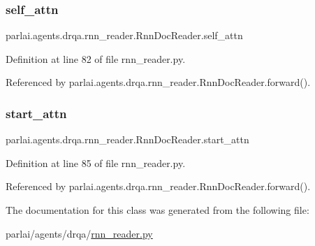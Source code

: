 \subsubsection{\texorpdfstring{self\+\_\+attn}{self\_attn}}
{\footnotesize\ttfamily parlai.\+agents.\+drqa.\+rnn\+\_\+reader.\+Rnn\+Doc\+Reader.\+self\+\_\+attn}



Definition at line 82 of file rnn\+\_\+reader.\+py.



Referenced by parlai.\+agents.\+drqa.\+rnn\+\_\+reader.\+Rnn\+Doc\+Reader.\+forward().

\mbox{\label{classparlai_1_1agents_1_1drqa_1_1rnn__reader_1_1RnnDocReader_ad3f35e5ca950ee0bc56ba3dd41f38fdb}} 
\subsubsection{\texorpdfstring{start\+\_\+attn}{start\_attn}}
{\footnotesize\ttfamily parlai.\+agents.\+drqa.\+rnn\+\_\+reader.\+Rnn\+Doc\+Reader.\+start\+\_\+attn}



Definition at line 85 of file rnn\+\_\+reader.\+py.



Referenced by parlai.\+agents.\+drqa.\+rnn\+\_\+reader.\+Rnn\+Doc\+Reader.\+forward().



The documentation for this class was generated from the following file\+:\begin{DoxyCompactItemize}
\item 
parlai/agents/drqa/\hyperlink{rnn__reader_8py}{rnn\+\_\+reader.\+py}\end{DoxyCompactItemize}
